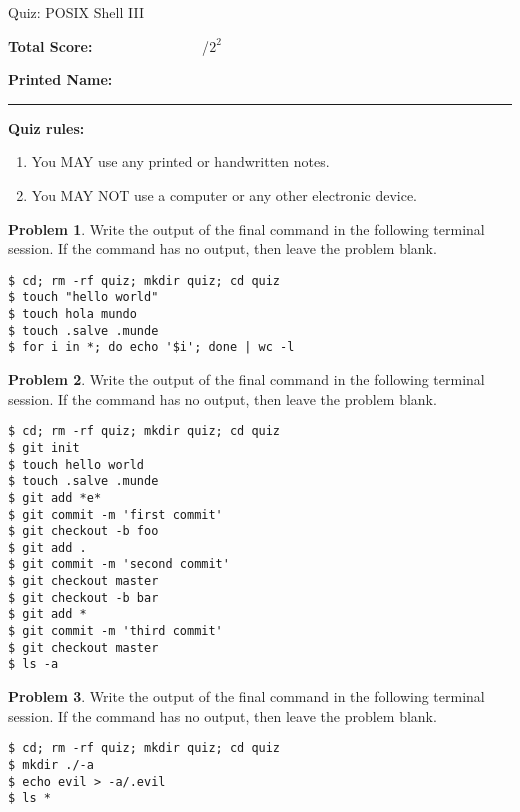 \documentclass[10pt]{article}
\theoremstyle{definition}
\newtheorem{problem}{Problem}
\begin{document}
\begin{center}
{
\Large
Quiz: POSIX Shell III
}

\vspace{0.1in}
\end{center}

\vspace{0.15in}
\noindent
\textbf{Total Score:} ~~~~~~~~~~~~~~~/$2^2$

\vspace{0.2in}
\noindent
\textbf{Printed Name:}

\noindent
\rule{\textwidth}{0.1pt}
\vspace{0.15in}

\noindent
\textbf{Quiz rules:}
\begin{enumerate}
\item You MAY use any printed or handwritten notes.
\item You MAY NOT use a computer or any other electronic device.
\end{enumerate}

\noindent

\vspace{0.15in}

\filbreak
\begin{problem}
    Write the output of the final command in the following terminal session.
    If the command has no output, then leave the problem blank.
\end{problem}
\begin{lstlisting}
$ cd; rm -rf quiz; mkdir quiz; cd quiz
$ touch "hello world"
$ touch hola mundo
$ touch .salve .munde
$ for i in *; do echo '$i'; done | wc -l
\end{lstlisting}

\vspace{1in}
\begin{problem}
    Write the output of the final command in the following terminal session.
    If the command has no output, then leave the problem blank.
\end{problem}
\begin{lstlisting}
$ cd; rm -rf quiz; mkdir quiz; cd quiz
$ git init
$ touch hello world
$ touch .salve .munde
$ git add *e*
$ git commit -m 'first commit'
$ git checkout -b foo
$ git add .
$ git commit -m 'second commit'
$ git checkout master
$ git checkout -b bar
$ git add *
$ git commit -m 'third commit'
$ git checkout master
$ ls -a
\end{lstlisting}

\filbreak
\begin{problem}
    Write the output of the final command in the following terminal session.
    If the command has no output, then leave the problem blank.
\end{problem}
\begin{lstlisting}
$ cd; rm -rf quiz; mkdir quiz; cd quiz
$ mkdir ./-a
$ echo evil > -a/.evil
$ ls *
\end{lstlisting}
\end{document}
